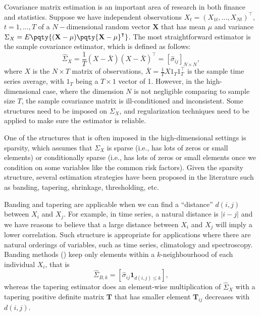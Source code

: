 Covariance matrix estimation is an important area of research in both finance and statistics. Suppose we have independent observations ${X}_{t}=(X_{1t},\dots,X_{Nt})^{\intercal}$, $t=1,\dots,T$ of a $N-$dimensional random vector \(\mathbf{X}\) that has mean \(\mu\) and variance ${\Sigma}_{X} =E\pqty{(\mathbf{X} - \mu) \pqty{\mathbf{X} - \mu}^{\intercal}}$. The most straightforward estimator is the sample covariance estimator, which is defined as follows:
\begin{equation}
{\hat{\Sigma}_{X}}=\frac{1}{T}({X}-\bar{{X}})({X}-\bar{{X}})^{\intercal}=[\hat{\sigma}_{ij}]_{N\times N},
\end{equation}
where ${X}$ is the $N\times T$ matrix of observations, $\bar{{X}}=\frac{1}{T}{X}{1}_{T}{1}_{T}^{\intercal}$ is the sample time series average, with ${1}_{T}$ being a $T\times 1$ vector of 1. However, in the high-dimensional case, where the dimension $N$ is not negligible comparing to sample size $T$, the sample covariance matrix is ill-conditioned and inconsistent. Some structures need to be imposed on  ${\Sigma}_{X}$, and regularization techniques need to be applied to make sure the estimator is reliable. 

One of the structures that is often imposed in the high-dimensional settings is sparsity, which assumes that ${\Sigma}_{X}$ is sparse (i.e., has lots of zeros or small elements) or conditionally sparse (i.e., has lots of zeros or small elements once we condition on some variables like the common risk factors). Given the sparsity structure, several estimation strategies have been proposed in the literature such as banding, tapering, shrinkage, thresholding, etc. 

Banding and tapering are applicable when we can find a ``distance'' \(d(i,j)\) between \(X_{i}\) and \(X_{j}\). For example, in time series, a natural distance is $|i-j|$ and we have reasons to believe that a large distance between \(X_{i}\) and \(X_{j}\) will imply a lower correlation. Such structure is appropriate for applications where there are natural orderings of variables, such as time series, climatology and spectroscopy. Banding methods (\cite{bickel2008RegularizedEstimation}) keep only elements within a \(k\)-neighbourhood of each individual \(X_{i}\), that is 
\begin{equation*}
    \hat{\Sigma}_{B,k} = [\hat{\sigma}_{ij} \mathbf{1}_{d(i,j) \leq k}],
\end{equation*}
whereas the tapering estimator does an element-wise multiplication of \(\hat{\Sigma}_{X}\) with a tapering positive definite matrix \(\mathbf{T}\) that has smaller element \(\mathbf{T}_{ij}\) decreases with \(d(i,j)\). 

